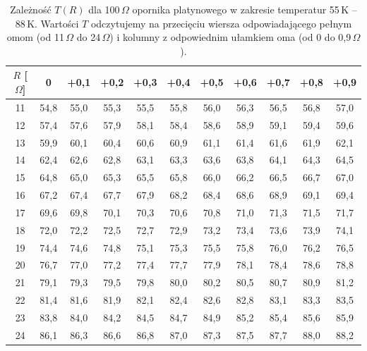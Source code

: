 \documentclass{fizykalab}
\begin{document}
\begin{table}[h]
\centering
\caption{Zależność $T(R)$ dla 100\,\(\Omega\) opornika platynowego w zakresie temperatur 55\,K -- 88\,K. Wartości $T$ odczytujemy na przecięciu wiersza odpowiadającego pełnym omom (od 11\,\(\Omega\) do 24\,\(\Omega\)) i kolumny z odpowiednim ułamkiem oma (od 0 do 0,9\,\(\Omega\)).}
\label{tab:pt_resistance}

\begin{tabular}{c|cccccccccc}
\toprule
$R$ [\(\Omega\)] & 0 & +0,1 & +0,2 & +0,3 & +0,4 & +0,5 & +0,6 & +0,7 & +0,8 & +0,9 \\
\midrule
11 & 54,8 & 55,0 & 55,3 & 55,5 & 55,8 & 56,0 & 56,3 & 56,5 & 56,8 & 57,0 \\
12 & 57,4 & 57,6 & 57,9 & 58,1 & 58,4 & 58,6 & 58,9 & 59,1 & 59,4 & 59,6 \\
13 & 59,9 & 60,1 & 60,4 & 60,6 & 60,9 & 61,1 & 61,4 & 61,6 & 61,9 & 62,1 \\
14 & 62,4 & 62,6 & 62,8 & 63,1 & 63,3 & 63,6 & 63,8 & 64,1 & 64,3 & 64,5 \\
15 & 64,8 & 65,0 & 65,3 & 65,5 & 65,8 & 66,0 & 66,2 & 66,5 & 66,7 & 67,0 \\
16 & 67,2 & 67,4 & 67,7 & 67,9 & 68,2 & 68,4 & 68,6 & 68,9 & 69,1 & 69,4 \\
17 & 69,6 & 69,8 & 70,1 & 70,3 & 70,6 & 70,8 & 71,0 & 71,3 & 71,5 & 71,7 \\
18 & 72,0 & 72,2 & 72,5 & 72,7 & 72,9 & 73,2 & 73,4 & 73,6 & 73,9 & 74,1 \\
19 & 74,4 & 74,6 & 74,8 & 75,1 & 75,3 & 75,5 & 75,8 & 76,0 & 76,2 & 76,5 \\
20 & 76,7 & 77,0 & 77,2 & 77,4 & 77,7 & 77,9 & 78,1 & 78,4 & 78,6 & 78,8 \\
21 & 79,1 & 79,3 & 79,5 & 79,8 & 80,0 & 80,2 & 80,5 & 80,7 & 80,9 & 81,2 \\
22 & 81,4 & 81,6 & 81,9 & 82,1 & 82,4 & 82,6 & 82,8 & 83,1 & 83,3 & 83,5 \\
23 & 83,8 & 84,0 & 84,2 & 84,5 & 84,7 & 84,9 & 85,2 & 85,4 & 85,6 & 85,9 \\
24 & 86,1 & 86,3 & 86,6 & 86,8 & 87,0 & 87,3 & 87,5 & 87,7 & 88,0 & 88,2 \\
\bottomrule
\end{tabular}

\end{table}
\end{document}
